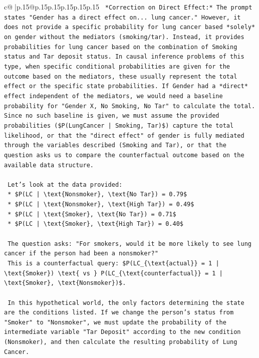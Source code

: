 \documentclass{article}
\begin{document}
{\begin{supertabular}{c@{$\;$}|p{.15\linewidth}@{}p{.15\linewidth}p{.15\linewidth}p{.15\linewidth}p{.15\linewidth}p{.15\linewidth}}
{{{\texttt{    *Correction on Direct Effect:* The prompt states "Gender has a direct effect on... lung cancer." However, it does not provide a specific probability for lung cancer based *solely* on gender without the mediators (smoking/tar). Instead, it provides probabilities for lung cancer based on the combination of Smoking status and Tar deposit status. In causal inference problems of this type, when specific conditional probabilities are given for the outcome based on the mediators, these usually represent the total effect or the specific state probabilities. If Gender had a *direct* effect independent of the mediators, we would need a baseline probability for "Gender X, No Smoking, No Tar" to calculate the total. Since no such baseline is given, we must assume the provided probabilities (\$P(LungCancer | Smoking, Tar)\$) capture the total likelihood, or that the "direct effect" of gender is fully mediated through the variables described (Smoking and Tar), or that the question asks us to compare the counterfactual outcome based on the available data structure.} \\
\\ 
\texttt{    Let's look at the data provided:} \\
\texttt{    *   \$P(LC | \textbackslash{}text\{Nonsmoker\}, \textbackslash{}text\{No Tar\}) = 0.79\$} \\
\texttt{    *   \$P(LC | \textbackslash{}text\{Nonsmoker\}, \textbackslash{}text\{High Tar\}) = 0.49\$} \\
\texttt{    *   \$P(LC | \textbackslash{}text\{Smoker\}, \textbackslash{}text\{No Tar\}) = 0.71\$} \\
\texttt{    *   \$P(LC | \textbackslash{}text\{Smoker\}, \textbackslash{}text\{High Tar\}) = 0.40\$} \\
\\ 
\texttt{    The question asks: "For smokers, would it be more likely to see lung cancer if the person had been a nonsmoker?"} \\
\texttt{    This is a counterfactual query: \$P(LC\_\{\textbackslash{}text\{actual\}\} = 1 | \textbackslash{}text\{Smoker\}) \textbackslash{}text\{ vs \} P(LC\_\{\textbackslash{}text\{counterfactual\}\} = 1 | \textbackslash{}text\{Smoker\}, \textbackslash{}text\{Nonsmoker\})\$.} \\
\\ 
\texttt{    In this hypothetical world, the only factors determining the state are the conditions listed. If we change the person's status from "Smoker" to "Nonsmoker", we must update the probability of the intermediate variable "Tar Deposit" according to the new condition (Nonsmoker), and then calculate the resulting probability of Lung Cancer.} \\
}}}
\end{supertabular}}
\end{document}
